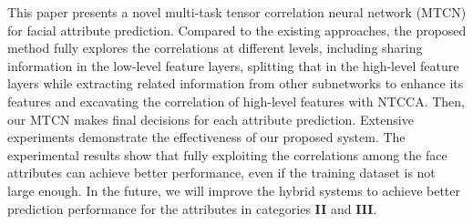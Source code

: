 \documentclass{sig-alternate-05-2015}
\begin{document}
This paper presents a novel multi-task tensor correlation neural network (MTCN) for facial attribute prediction. Compared to the existing approaches, the proposed method fully explores the correlations at different levels, including sharing information in the low-level feature layers, splitting that in the high-level feature layers while extracting related information from other subnetworks to enhance its features and excavating the correlation of high-level features with NTCCA. Then, our MTCN makes final decisions for each attribute prediction. Extensive experiments demonstrate the effectiveness of our proposed system. The experimental results show that fully exploiting the correlations among the face attributes can achieve better performance, even if the training dataset is not large enough. In the future, we will improve the hybrid systems to achieve better prediction performance for the attributes in categories \textbf{II} and \textbf{III}.



\end{document}

